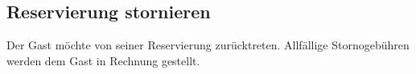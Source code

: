 \documentclass[../SubfileFeatures.tex]{subfiles}
\begin{document}
    \subsection{Reservierung stornieren}
	Der Gast möchte von seiner Reservierung zurücktreten. Allfällige Stornogebühren werden dem Gast in Rechnung gestellt.
\end{document}
